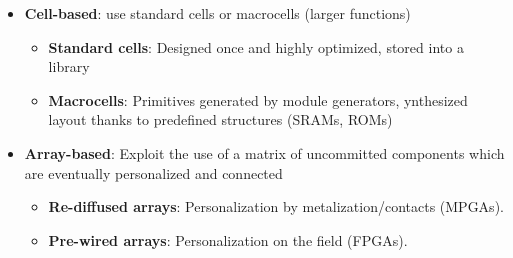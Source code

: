 \begin{itemize}
\item \textbf{Cell-based}: use  standard cells  or  macrocells  (larger functions)
\begin{itemize}
\item \textbf{Standard cells}: Designed once and highly optimized, stored into a library
\item  \textbf{Macrocells}: Primitives generated by  module generators, ynthesized layout thanks to predefined structures (SRAMs, ROMs)
\end{itemize}
\item \textbf{Array-based}:  Exploit the use of a matrix of uncommitted components which are eventually personalized and connected
\begin{itemize}
\item \textbf{Re-diffused arrays}: Personalization by metalization/contacts (MPGAs).
\item \textbf{Pre-wired arrays}: Personalization on the field (FPGAs).
\end{itemize}
\end{itemize}

